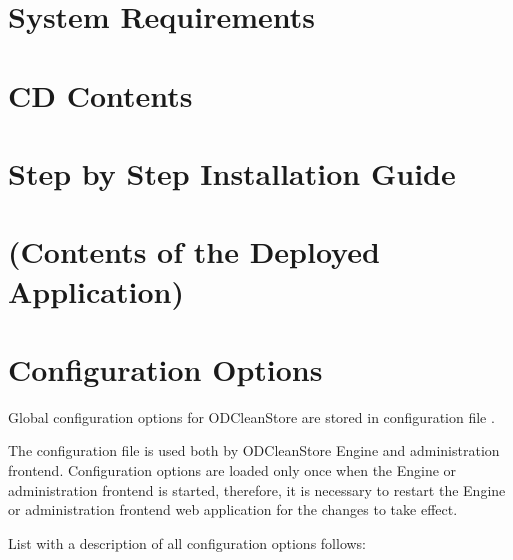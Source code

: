 
\newcommand{\version}{0.3.1}
\newcommand{\documentname}{\refadminmanual}

\hypersetup{pdftitle=ODCleanStore -- \documentname}





\renewcommand{\contentsname}{Contents}
\tableofcontents
\bigskip

\newpage


\chapter{System Requirements}

\chapter{CD Contents}

\chapter{Step by Step Installation Guide}




\chapter{(Contents of the Deployed Application)}

\chapter{Configuration Options}
Global configuration options for ODCleanStore are stored in configuration file . 

The configuration file is used both by ODCleanStore Engine and administration frontend. Configuration options are loaded only once when the Engine or administration frontend is started, therefore, it is necessary to restart the Engine or administration frontend web application for the changes to take effect.

List with a description of all configuration options follows:

